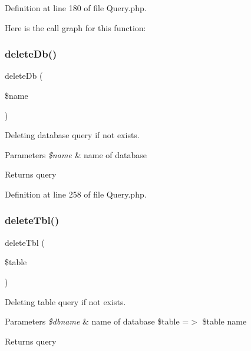 Definition at line 180 of file Query.\+php.

Here is the call graph for this function\+:
\mbox{\label{class_zest_1_1_database_1_1_query_1_1_query_ae35a90b0a5f1b3d17dfbe5323b6d6983}} 
\subsubsection{\texorpdfstring{delete\+Db()}{deleteDb()}}
{\footnotesize\ttfamily delete\+Db (\begin{DoxyParamCaption}\item[{}]{\$name }\end{DoxyParamCaption})}

Deleting database query if not exists.


\begin{DoxyParams}{Parameters}
{\em \$name} & name of database\\
\hline
\end{DoxyParams}
\begin{DoxyReturn}{Returns}
query 
\end{DoxyReturn}


Definition at line 258 of file Query.\+php.

\mbox{\label{class_zest_1_1_database_1_1_query_1_1_query_a865173a2c9500d4ba41ce697bd71209a}} 
\subsubsection{\texorpdfstring{delete\+Tbl()}{deleteTbl()}}
{\footnotesize\ttfamily delete\+Tbl (\begin{DoxyParamCaption}\item[{}]{\$table }\end{DoxyParamCaption})}

Deleting table query if not exists.


\begin{DoxyParams}{Parameters}
{\em \$dbname} & name of database \$table =$>$ \$table name\\
\hline
\end{DoxyParams}
\begin{DoxyReturn}{Returns}
query 
\end{DoxyReturn}



